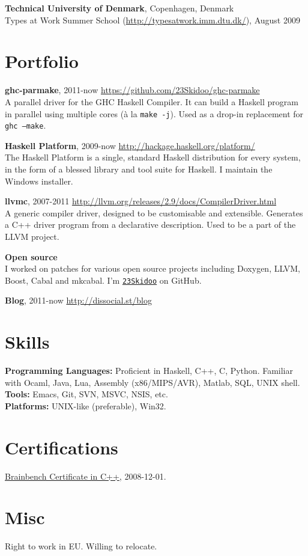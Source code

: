 \documentclass[margin,line]{res}
\begin{document}
\begin{resume}
{\bf Technical University of Denmark}, Copenhagen, Denmark\\
Types at Work Summer School (\url{http://typesatwork.imm.dtu.dk/}), August 2009

\section{\sc Portfolio}

{\bf ghc-parmake}, 2011-now \hfill \url{https://github.com/23Skidoo/ghc-parmake}\\
A parallel driver for the GHC Haskell Compiler. It can build a Haskell
program in parallel using multiple cores (à la \texttt{make -j}). Used as a
drop-in replacement for \texttt{ghc --make}.

{\bf Haskell Platform}, 2009-now \hfill \url{http://hackage.haskell.org/platform/}\\
The Haskell Platform is a single, standard Haskell distribution for every
system, in the form of a blessed library and tool suite for Haskell. I maintain
the Windows installer.

{\bf llvmc}, 2007-2011 \hfill \url{http://llvm.org/releases/2.9/docs/CompilerDriver.html}\\
A generic compiler driver, designed to be customisable and extensible. Generates
a C++ driver program from a declarative description. Used to be a part of the
LLVM project.


{\bf Open source}\\ I worked on patches for various open source projects
including Doxygen, LLVM, Boost, Cabal and mkcabal. I'm
\href{https://github.com/23Skidoo/}{\texttt{23Skidoo}} on GitHub.

{\bf Blog}, 2011-now \hfill \url{http://dissocial.st/blog}

\section{\sc Skills}

{\bf Programming Languages:} Proficient in Haskell, C++, C, Python. Familiar
with Ocaml, Java, Lua, Assembly (x86/MIPS/AVR), Matlab, SQL, UNIX shell. \\
{\bf Tools:} Emacs, Git, SVN, MSVC, NSIS, etc.\\
{\bf Platforms:} UNIX-like (preferable), Win32.

\section{\sc Certifications}

\href{http://www.brainbench.com/transcript.jsp?pid=5078355}
{Brainbench Certificate in C++}, 2008-12-01.

\section{\sc Misc}

Right to work in EU. Willing to relocate.

\end{resume}
\end{document}
